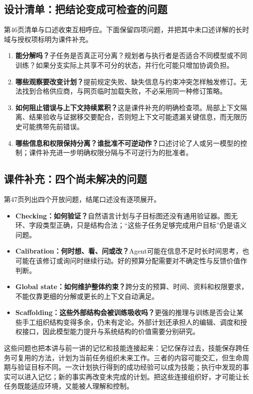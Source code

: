 \documentclass[11pt,a4paper]{article}
\begin{document}
\subsection{设计清单：把结论变成可检查的问题}
第46页清单与口述收束互相呼应。下面保留四项问题，并把其中未口述详解的长时域与授权项标明为课件补充。
\begin{enumerate}
\item \textbf{能分解吗？}子任务是否真正可分离？规划者与执行者是否适合不同模型或不同训练？如果分支实际上共享不可分的状态，并行化可能只增加协调负担。
\item \textbf{哪些观察要改变计划？}提前规定失败、缺失信息与约束冲突怎样触发修订。无法找到合格供应商，与网页临时加载失败，不必采用同一种修订策略。
\item \textbf{如何阻止错误与上下文持续累积？}这是课件补充的明确检查项。局部上下文隔离、结果验收与证据移交要配合，否则短上下文可能遗漏关键信息，而无限历史可能携带先前错误。
\item \textbf{哪些信息和权限保持分离？谁批准不可逆动作？}口述讨论了人或另一模型的控制；课件补充进一步明确权限分隔与不可逆行为的批准者。
\end{enumerate}

\subsection{课件补充：四个尚未解决的问题}
第47页列出四个开放问题，结尾口述没有逐项展开。
\begin{itemize}
\item \textbf{Checking：如何验证？}自然语言计划与子目标图还没有通用验证器。图无环、字段类型正确，只是结构合法；“这些子任务足够完成用户目标”仍是语义问题。
\item \textbf{Calibration：何时想、看、问或改？}Agent可能在信息不足时长时间思考，也可能在该修订或询问时继续行动。好的预算分配需要对不确定性与反馈价值作判断。
\item \textbf{Global state：如何维护整体约束？}跨分支的预算、时间、资料和权限要求，不能仅靠更细的分解或更长的上下文自动满足。
\item \textbf{Scaffolding：这些外部结构会被训练吸收吗？}更强的推理与训练是否会让某些手工组织结构变得多余，仍未有定论。外部计划还承担人的编辑、调度和授权接口，因此模型能力提升与系统结构的价值需要分别研究。
\end{itemize}

这些问题也把本讲与前一讲的记忆和技能连接起来：记忆保存过去，技能保存跨任务可复用的方法，计划为当前任务组织未来工作。三者的内容可能交汇，但生命周期与验证目标不同。一次计划执行得到的成功经验可以成为技能；执行中发现的事实可以进入记忆；新的事实再改变未完成的计划。把这些连接组织好，才可能让长任务既能适应环境，又能被人理解和控制。
\end{document}
